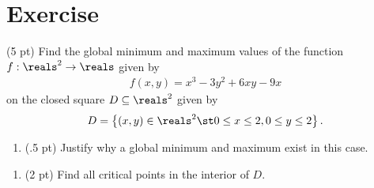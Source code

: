 \section{Exercise}

(5 pt) Find the global minimum and maximum values of the function $f: \reals^{2} \rightarrow \reals$ given by
\begin{align*}
f(x,y)
=
x^{3} - 3 y^{2} + 6 x y - 9 x
\end{align*}
on the closed square $D \subseteq \reals^{2}$ given by
\begin{align*}
D
=
\left\{(x,y) \in \reals^{2} \st 0 \leq x \leq 2,0 \leq y \leq 2\right\}.
\end{align*}
\begin{enumerate}[label=(\alph*)]
\item (.5 pt) Justify why a global minimum and maximum exist in this case. 
\end{enumerate}




\begin{enumerate}[resume,label=(\alph*)]
\item\label{itm: Quiz19 Interior Critical Points} (2 pt) Find all critical points in the interior of $D$. 
\end{enumerate}

